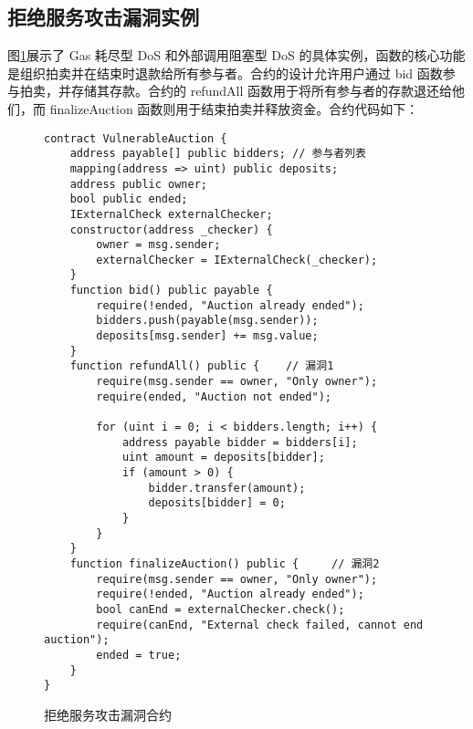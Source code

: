\documentclass[print, master, vlined, timesmath]{DissertUESTC}
\begin{document}

\subsection{拒绝服务攻击漏洞实例}
图\ref{fig:拒绝服务攻击漏洞合约}展示了 Gas 耗尽型 DoS 和外部调用阻塞型 DoS 的具体实例，函数的核心功能是组织拍卖并在结束时退款给所有参与者。合约的设计允许用户通过 bid 函数参与拍卖，并存储其存款。合约的 refundAll 函数用于将所有参与者的存款退还给他们，而 finalizeAuction 函数则用于结束拍卖并释放资金。合约代码如下：

\begin{figure}[htbp]
    \centering
    \begin{minipage}{0.9\textwidth}
    \begin{verbatim}
contract VulnerableAuction {
    address payable[] public bidders; // 参与者列表
    mapping(address => uint) public deposits;
    address public owner;
    bool public ended;
    IExternalCheck externalChecker;
    constructor(address _checker) {
        owner = msg.sender;
        externalChecker = IExternalCheck(_checker);
    }
    function bid() public payable {
        require(!ended, "Auction already ended");
        bidders.push(payable(msg.sender));
        deposits[msg.sender] += msg.value;
    }
    function refundAll() public {    // 漏洞1
        require(msg.sender == owner, "Only owner");
        require(ended, "Auction not ended");

        for (uint i = 0; i < bidders.length; i++) {
            address payable bidder = bidders[i];
            uint amount = deposits[bidder];
            if (amount > 0) {
                bidder.transfer(amount);
                deposits[bidder] = 0;
            }
        }
    }
    function finalizeAuction() public {     // 漏洞2
        require(msg.sender == owner, "Only owner");
        require(!ended, "Auction already ended");
        bool canEnd = externalChecker.check();
        require(canEnd, "External check failed, cannot end auction");
        ended = true;
    }
}
    \end{verbatim}
    \end{minipage}
    \caption{拒绝服务攻击漏洞合约}
    \label{fig:拒绝服务攻击漏洞合约}
\end{figure}
\end{document}
